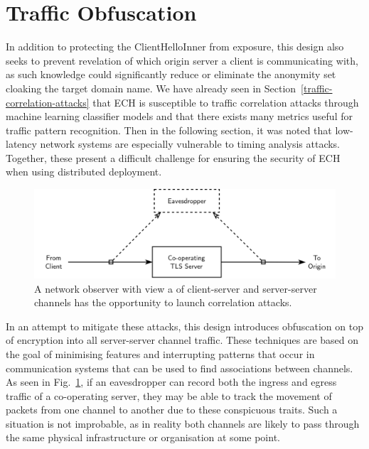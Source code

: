 \section{Traffic Obfuscation}

In addition to protecting the ClientHelloInner from exposure, this design also seeks to prevent revelation of which origin server a client is communicating with, as such knowledge could significantly reduce or eliminate the anonymity set cloaking the target domain name. We have already seen in Section~\ref{traffic-correlation-attacks} that ECH is susceptible to traffic correlation attacks through machine learning classifier models and that there exists many metrics useful for traffic pattern recognition. Then in the following section, it was noted that low-latency network systems are especially vulnerable to timing analysis attacks. Together, these present a difficult challenge for ensuring the security of ECH when using distributed deployment.

\begin{figure}[ht]
\centerline{\includegraphics[width=150mm]{images/correlation-attack.png}}
\caption[Diagram of how a correlation attack can be used]{A network observer with view a of client-server and server-server channels has the opportunity to launch correlation attacks.}
\label{correlation_figure}
\end{figure}

In an attempt to mitigate these attacks, this design introduces obfuscation on top of encryption into all server-server channel traffic. These techniques are based on the goal of minimising features and interrupting patterns that occur in communication systems that can be used to find associations between channels. As seen in Fig.~\ref{correlation_figure}, if an eavesdropper can record both the ingress and egress traffic of a co-operating server, they may be able to track the movement of packets from one channel to another due to these conspicuous traits. Such a situation is not improbable, as in reality both channels are likely to pass through the same physical infrastructure or organisation at some point.

